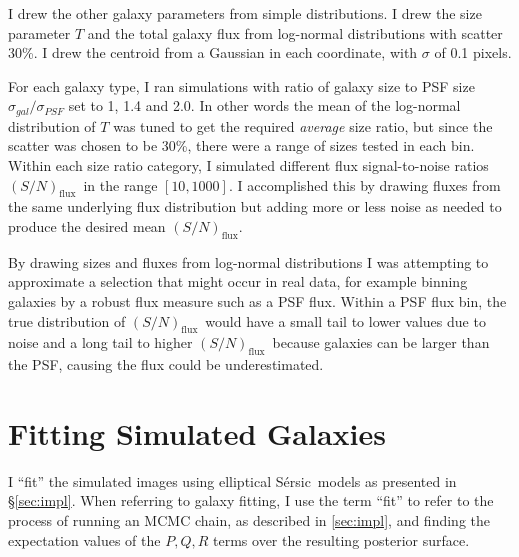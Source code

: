 \documentclass[12pt,preprint]{aastex}
\newcommand{\fsn}{$(S/N)_{\textrm{flux}}$}
\newcommand{\sersic}{S\'{e}rsic}
\begin{document}
I drew the other galaxy parameters from simple distributions.  I drew the size
parameter $T$ and the total galaxy flux from log-normal distributions with
scatter 30\%.  I drew the centroid from a Gaussian in each coordinate, with
$\sigma$ of 0.1 pixels.

For each galaxy type, I ran simulations with ratio of galaxy size to PSF size
$\sigma_{gal}/\sigma_{PSF}$ set to 1, 1.4 and 2.0.  In other words the mean of
the log-normal distribution of $T$ was tuned to get the required {\it average}
size ratio, but since the scatter was chosen to be 30\%, there were a range of
sizes tested in each bin.  Within each size ratio category, I simulated
different flux signal-to-noise ratios \fsn\ in the range $[10,1000]$.  I
accomplished this by drawing fluxes from the same underlying flux distribution
but adding more or less noise as needed to produce the desired mean \fsn.

By drawing sizes and fluxes from log-normal distributions I was attempting to
approximate a selection that might occur in real data, for example binning
galaxies by a robust flux measure such as a PSF flux.  Within a PSF flux bin,
the true distribution of \fsn\ would have a small tail to lower values due to
noise and a long tail to higher \fsn\ because galaxies can be larger than the
PSF, causing the flux could be underestimated.


\section{Fitting Simulated Galaxies} \label{sec:simfit}

I ``fit'' the simulated images using elliptical \sersic\ models as presented in
\S \ref{sec:impl}.   When referring to galaxy fitting, I use the term ``fit''
to refer to the process of running an MCMC chain, as described in
\ref{sec:impl}, and finding the expectation values of the $P,Q,R$ terms over
the resulting posterior surface.
\end{document}
